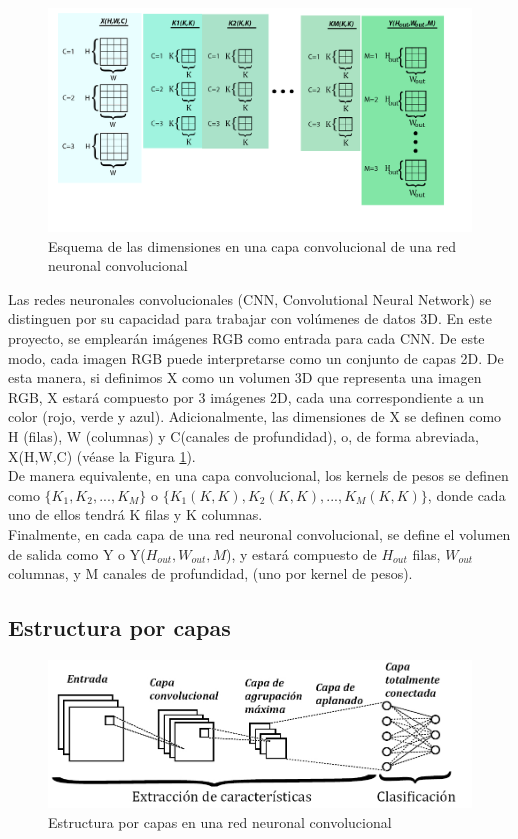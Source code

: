 \begin{figure}[H]
	\hspace{-10mm}
	\includegraphics[scale=0.2]{imagenes/conv_dims.jpg}  
	\caption{Esquema de las dimensiones en una capa convolucional de una red neuronal convolucional}
	\label{fig:Dimensiones_convolucion}
\end{figure}


Las redes neuronales convolucionales (CNN, Convolutional Neural Network) se distinguen por su capacidad para trabajar con volúmenes de datos 3D. En este proyecto, se emplearán imágenes RGB como entrada para cada CNN. De este modo, cada imagen RGB puede interpretarse como un conjunto de capas 2D. De esta manera, si definimos X como un volumen 3D que representa una imagen RGB, X estará compuesto por 3 imágenes 2D, cada una correspondiente a un color (rojo, verde y azul). 
Adicionalmente, las dimensiones de X se definen como H (filas), W (columnas) y C(canales de profundidad), o, de forma abreviada, X(H,W,C) (véase la Figura \ref{fig:Dimensiones_convolucion}). \\
De manera equivalente, en una capa convolucional, los kernels de pesos se definen como $\{K_1, K_2, ..., K_M\}$ o $\{K_1(K,K), K_2(K,K), ..., K_M(K,K)\}$, donde cada uno de ellos tendrá K filas y K columnas. \\
Finalmente, en cada capa de una red neuronal convolucional, se define el volumen de salida como Y o Y($H_{out}, W_{out}, M$), y estará compuesto de $H_{out}$ filas, $W_{out}$ columnas, y M canales de profundidad, (uno por kernel de pesos).

\subsection{Estructura por capas}

\begin{figure}[H]
	\centering
	\includegraphics[scale=0.35]{imagenes/CNN_estructura.jpg}  
	\caption{Estructura por capas en una red neuronal convolucional}
	\label{fig:CNN_estructura}
\end{figure}

